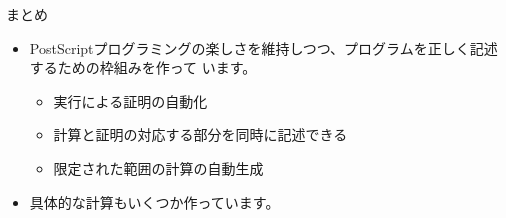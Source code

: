 \documentclass[cjk, 12pt, dvipdfm]{beamer}
\begin{document}
\begin{frame}{まとめ}

 \begin{itemize}
  \item PostScriptプログラミングの楽しさを維持しつつ、プログラムを正しく記述するための枠組みを作って
	います。
	\begin{itemize}
	 \item 実行による証明の自動化
	 \item 計算と証明の対応する部分を同時に記述できる
	 \item 限定された範囲の計算の自動生成
	\end{itemize}
  \item 具体的な計算もいくつか作っています。
 \end{itemize}

\end{frame}
\end{document}
